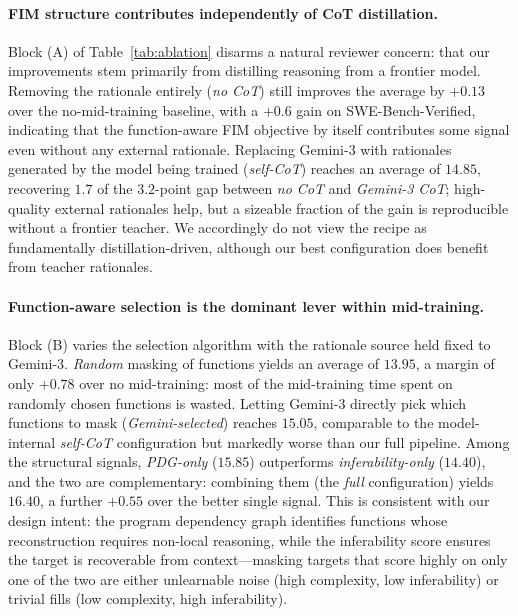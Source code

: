 \paragraph{FIM structure contributes independently of CoT distillation.}
Block (A) of Table~\ref{tab:ablation} disarms a natural reviewer concern:
that our improvements stem primarily from distilling reasoning from a
frontier model. Removing the rationale entirely (\emph{no CoT}) still
improves the average by $+0.13$ over the no-mid-training baseline, with a
$+0.6$ gain on SWE-Bench-Verified, indicating that the function-aware FIM
objective by itself contributes some signal even without any external
rationale. Replacing Gemini-3 with rationales generated by the model
being trained (\emph{self-CoT}) reaches an average of $14.85$, recovering
$1.7$ of the $3.2$-point gap between \emph{no CoT} and \emph{Gemini-3 CoT};
high-quality external rationales help, but a sizeable fraction of the
gain is reproducible without a frontier teacher. We accordingly do not
view the recipe as fundamentally distillation-driven, although our best
configuration does benefit from teacher rationales.

\paragraph{Function-aware selection is the dominant lever within mid-training.}
Block (B) varies the selection algorithm with the rationale source held
fixed to Gemini-3. \emph{Random} masking of functions yields an average of
$13.95$, a margin of only $+0.78$ over no mid-training: most of the
mid-training time spent on randomly chosen functions is wasted. Letting
Gemini-3 directly pick which functions to mask (\emph{Gemini-selected})
reaches $15.05$, comparable to the model-internal \emph{self-CoT}
configuration but markedly worse than our full pipeline. Among the
structural signals, \emph{PDG-only} ($15.85$) outperforms
\emph{inferability-only} ($14.40$), and the two are complementary:
combining them (the \emph{full} configuration) yields $16.40$, a further
$+0.55$ over the better single signal. This is consistent with our design
intent: the program dependency graph identifies functions whose
reconstruction requires non-local reasoning, while the inferability score
ensures the target is recoverable from context---masking targets that
score highly on only one of the two are either unlearnable noise (high
complexity, low inferability) or trivial fills (low complexity, high
inferability).